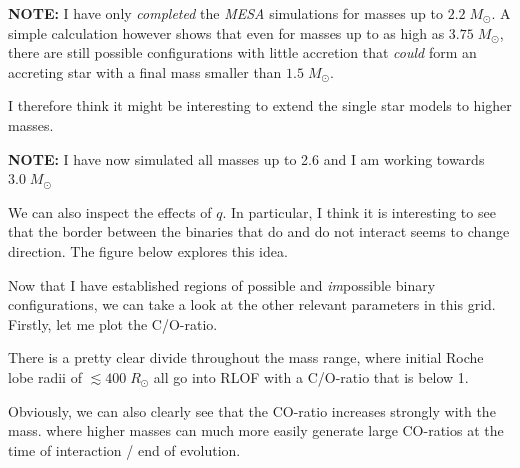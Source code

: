 \documentclass[a4paper,10pt]{article}
\begin{document}
\begin{figure}[ht]
    \centering
\end{figure}


\begin{questionbox}{}{}
\textbf{\textcolor{keywordscolor}{NOTE:}}
    I have only \emph{completed} the \emph{MESA} simulations for masses up to \(2.2\;M_\odot \). A simple calculation however shows that even for masses up to as high as \(3.75\;M_\odot \), there are still possible configurations with little accretion that \emph{could} form an accreting star with a final mass smaller than \(1.5\;M_\odot \).

    I therefore think it might be interesting to extend the single star models to higher masses.
\end{questionbox}

\begin{questionbox}{}{}
\textbf{\textcolor{keywordscolor}{NOTE:}}
    I have now simulated all masses up to 2.6 and I am working towards \(3.0\;M_\odot \)
\end{questionbox}

We can also inspect the effects of \(q\). In particular, I think it is interesting to see that the border between the binaries that do and do not interact seems to change direction. The figure below explores this idea.
\nextpage

\begin{figure}[ht]
    \centering
\end{figure}


Now that I have established regions of possible and \emph{im}possible binary configurations, we can take a look at the other relevant parameters in this grid. Firstly, let me plot the C/O-ratio.

\begin{figure}[ht]
    \centering
\end{figure}

There is a pretty clear divide throughout the mass range, where initial Roche lobe radii of \(\lesssim 400\;R_\odot \) all go into RLOF with a C/O-ratio that is below 1.

Obviously, we can also clearly see that the CO-ratio increases strongly with the mass. where higher masses can much more easily generate large CO-ratios at the time of interaction / end of evolution.

\begin{figure}[ht]
    \centering
\end{figure}
\end{document}
